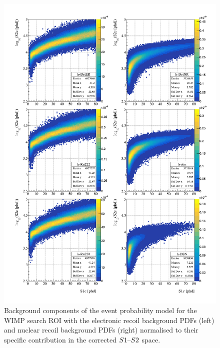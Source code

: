 %
\begin{figure}[h!]
    \centering
    \includegraphics[scale=0.7]{Chapter_5/Figures/sensitivity_studies/background_pdfs_1.pdf}
    \caption[Background components of the event probability model for the WIMP search ROI with the electronic recoil background PDFs (left) and nuclear recoil background PDFs (right) normalised to their specific contribution in the corrected $S1\mhyphen{}S2$ space.]%
    {Background components of the event probability model for the WIMP search ROI with the electronic recoil background PDFs (left) and nuclear recoil background PDFs (right) normalised to their specific contribution in the corrected $S1\mhyphen{}S2$ space.}
    \label{fig:lz_background_pdfs}
\end{figure}
%
